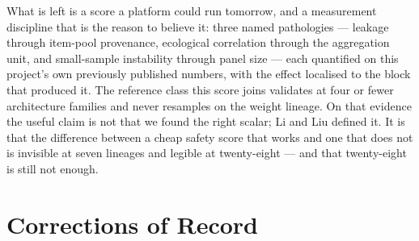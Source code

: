 \documentclass[11pt,letterpaper]{article}
\begin{document}
What is left is a score a platform could run tomorrow, and a measurement discipline that is the reason to believe it: three named pathologies --- leakage through item-pool provenance, ecological correlation through the aggregation unit, and small-sample instability through panel size --- each quantified on this project's own previously published numbers, with the effect localised to the block that produced it. The reference class this score joins validates at four or fewer architecture families and never resamples on the weight lineage. On that evidence the useful claim is not that we found the right scalar; Li and Liu defined it. It is that the difference between a cheap safety score that works and one that does not is invisible at seven lineages and legible at twenty-eight --- and that twenty-eight is still not enough.

\appendix
\section{Corrections of Record}
\end{document}
